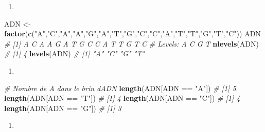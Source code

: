 \documentclass[
]{article}
\newenvironment{Shaded}{}{}
\newcommand{\CommentTok}[1]{\textcolor[rgb]{0.38,0.63,0.69}{\textit{#1}}}
\newcommand{\KeywordTok}[1]{\textcolor[rgb]{0.00,0.44,0.13}{\textbf{#1}}}
\newcommand{\NormalTok}[1]{#1}
\newcommand{\OperatorTok}[1]{\textcolor[rgb]{0.40,0.40,0.40}{#1}}
\newcommand{\StringTok}[1]{\textcolor[rgb]{0.25,0.44,0.63}{#1}}
\providecommand{\tightlist}{%
  \setlength{\itemsep}{0pt}\setlength{\parskip}{0pt}}
\begin{document}
\begin{enumerate}
\def\labelenumi{\arabic{enumi}.}
\setcounter{enumi}{9}
\tightlist
\item
\end{enumerate}

\begin{Shaded}
\begin{Highlighting}[]
\NormalTok{ADN \textless{}{-}}\StringTok{ }\KeywordTok{factor}\NormalTok{(}\KeywordTok{c}\NormalTok{(}\StringTok{"A"}\NormalTok{,}\StringTok{"C"}\NormalTok{,}\StringTok{"A"}\NormalTok{,}\StringTok{"A"}\NormalTok{,}\StringTok{"G"}\NormalTok{,}\StringTok{"A"}\NormalTok{,}\StringTok{"T"}\NormalTok{,}\StringTok{"G"}\NormalTok{,}\StringTok{"C"}\NormalTok{,}\StringTok{"C"}\NormalTok{,}\StringTok{"A"}\NormalTok{,}\StringTok{"T"}\NormalTok{,}\StringTok{"T"}\NormalTok{,}\StringTok{"G"}\NormalTok{,}\StringTok{"T"}\NormalTok{,}\StringTok{"C"}\NormalTok{))}
\NormalTok{ADN}
\CommentTok{\# [1] A C A A G A T G C C A T T G T C}
\CommentTok{\# Levels: A C G T}
\KeywordTok{nlevels}\NormalTok{(ADN)}
\CommentTok{\# [1] 4}
\KeywordTok{levels}\NormalTok{(ADN)}
\CommentTok{\# [1] "A" "C" "G" "T"}
\end{Highlighting}
\end{Shaded}

\begin{enumerate}
\def\labelenumi{\arabic{enumi}.}
\setcounter{enumi}{10}
\tightlist
\item
\end{enumerate}

\begin{Shaded}
\begin{Highlighting}[]
\CommentTok{\# Nombre de A dans le brin d\textquotesingle{}ADN}
\KeywordTok{length}\NormalTok{(ADN[ADN }\OperatorTok{==}\StringTok{ "A"}\NormalTok{])}
\CommentTok{\# [1] 5}
\KeywordTok{length}\NormalTok{(ADN[ADN }\OperatorTok{==}\StringTok{ "T"}\NormalTok{])}
\CommentTok{\# [1] 4}
\KeywordTok{length}\NormalTok{(ADN[ADN }\OperatorTok{==}\StringTok{ "C"}\NormalTok{])}
\CommentTok{\# [1] 4}
\KeywordTok{length}\NormalTok{(ADN[ADN }\OperatorTok{==}\StringTok{ "G"}\NormalTok{])}
\CommentTok{\# [1] 3}
\end{Highlighting}
\end{Shaded}

\begin{enumerate}
\def\labelenumi{\arabic{enumi}.}
\setcounter{enumi}{11}
\tightlist
\item
\end{enumerate}
\end{document}
